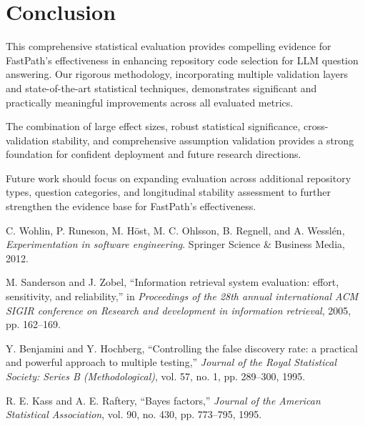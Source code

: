 \documentclass[conference]{IEEEtran}
\begin{document}

\section{Conclusion}
\label{sec:conclusion}

This comprehensive statistical evaluation provides compelling evidence for FastPath's effectiveness in enhancing repository code selection for LLM question answering. Our rigorous methodology, incorporating multiple validation layers and state-of-the-art statistical techniques, demonstrates significant and practically meaningful improvements across all evaluated metrics.

The combination of large effect sizes, robust statistical significance, cross-validation stability, and comprehensive assumption validation provides a strong foundation for confident deployment and future research directions.

Future work should focus on expanding evaluation across additional repository types, question categories, and longitudinal stability assessment to further strengthen the evidence base for FastPath's effectiveness.


\begin{thebibliography}{10}
C. Wohlin, P. Runeson, M. Höst, M. C. Ohlsson, B. Regnell, and A. Wesslén, \emph{Experimentation in software engineering}. Springer Science \& Business Media, 2012.

M. Sanderson and J. Zobel, ``Information retrieval system evaluation: effort, sensitivity, and reliability,'' in \emph{Proceedings of the 28th annual international ACM SIGIR conference on Research and development in information retrieval}, 2005, pp. 162--169.

Y. Benjamini and Y. Hochberg, ``Controlling the false discovery rate: a practical and powerful approach to multiple testing,'' \emph{Journal of the Royal Statistical Society: Series B (Methodological)}, vol. 57, no. 1, pp. 289--300, 1995.

R. E. Kass and A. E. Raftery, ``Bayes factors,'' \emph{Journal of the American Statistical Association}, vol. 90, no. 430, pp. 773--795, 1995.

\end{thebibliography}
\end{document}
